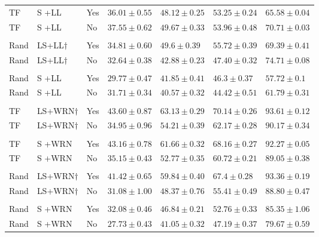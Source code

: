 \documentclass[10pt,twocolumn,letterpaper]{article}
\begin{document}
\begin{table}[H]
\begin{tabularx}{340pt}{lllllll}
         TF &S +LL&Yes&$36.01\pm0.55$ & $48.12\pm0.25$ &$53.25\pm 0.24$&$65.58\pm0.04$ \\ 
        TF &S +LL&No&$\mathbf{37.55}\pm0.62$ & $\mathbf{49.67}\pm0.33$ &$\mathbf{53.96}\pm 0.48$&$\mathbf{70.71}\pm0.03$ \\ 
         \hline
        \\[-2mm]
        Rand &LS+LL$\dagger$&Yes& $\mathbf{34.81}\pm0.60$ & $\mathbf{49.6}\pm0.39$ &$\mathbf{55.72}\pm0.39$&$69.39\pm0.41$ \\ 
        Rand &LS+LL$\dagger$&No& $32.64\pm0.38$ & $42.88\pm0.23$ &$47.40\pm0.32$&$\mathbf{74.71}\pm0.08$ \\  \hline
        \\[-2mm]
        Rand &S +LL&Yes& $29.77\pm0.47$ & $\mathbf{41.85}\pm0.41$ &$\mathbf{46.3}\pm0.37$&$57.72\pm0.1$ \\
        Rand &S +LL&No& $\mathbf{31.71}\pm0.34$ & $40.57\pm0.32$ &$44.42\pm0.51$&$\mathbf{61.79}\pm0.31$ \\ \hline
        \\[-2mm]
         TF &LS+WRN$\dagger$&Yes&$\mathbf{43.60}\pm0.87$ & $\mathbf{63.13}\pm0.29$ &$\mathbf{70.14}\pm0.26$&$\mathbf{93.61}\pm0.12$ \\
        TF &LS+WRN$\dagger$&No&$ 34.95 \pm 0.96 $ & $ 54.21 \pm 0.39 $ &$ 62.17 \pm 0.28 $&$ 90.17 \pm 0.34$ \\ 
            \hline
        \\[-2mm]
        TF &S +WRN&Yes&$\mathbf{43.16}\pm0.78$ & $\mathbf{61.66}\pm0.32$ &$\mathbf{68.16}\pm0.27$ &$\mathbf{92.27}\pm0.05$ \\ 
        TF &S +WRN&No&$ 35.15 \pm 0.43 $ & $ 52.77 \pm 0.35 $ &$ 60.72 \pm 0.21 $ &$ 89.05 \pm 0.38$ \\
         \hline
        \\[-2mm]
        Rand &LS+WRN$\dagger$&Yes& $\mathbf{41.42}\pm0.65$ & $\mathbf{59.84}\pm0.40$ &$\mathbf{67.4}\pm0.28$&$\mathbf{93.36}\pm0.19$ \\
        Rand &LS+WRN$\dagger$&No& $ 31.08 \pm 1.00 $ & $ 48.37 \pm 0.76 $ &$ 55.41 \pm 0.49 $&$ 88.80 \pm 0.47 $ \\ 
         \hline
        \\[-2mm]
        Rand &S +WRN&Yes&$\mathbf{32.08}\pm0.46$ & $\mathbf{46.84}\pm0.21$ &$\mathbf{52.76}\pm0.33$&$\mathbf{85.35}\pm1.06$ \\
        Rand &S +WRN&No& $ 27.73 \pm 0.43 $ & $ 41.05 \pm 0.32 $ &$ 47.19 \pm 0.37 $&$ 79.67 \pm 0.59 $ \\ \hline

\end{tabularx}
\end{table}
\end{document}
